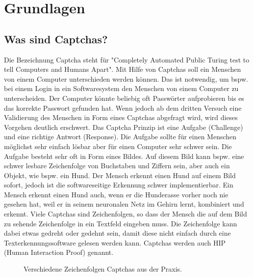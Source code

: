 \section{Grundlagen}

\subsection{Was sind Captchas?}
Die Bezeichnung Captcha steht für "Completely Automated Public Turing test to tell Computers and Humans Apart". Mit Hilfe von Captchas soll ein Menschen von einem Computer unterschieden werden können. Das ist notwendig, um bspw. bei einem Login in ein Softwaresystem den Menschen von einem Computer zu unterscheiden. Der Computer könnte  beliebig oft Passwörter aufprobieren bis es das korrekte Passwort gefunden hat. Wenn jedoch ab dem dritten Versuch eine Validierung des Menschen in Form eines Captchas abgefragt wird, wird dieses Vorgehen deutlich erschwert. Das Captcha Prinzip ist eine Aufgabe (Challenge) und eine richtige Antwort (Response). Die Aufgabe sollte für einen Menschen möglichst sehr einfach lösbar aber für einen Computer sehr schwer sein. Die Aufgabe besteht sehr oft in Form eines Bildes. Auf diesem Bild kann bspw. eine schwer lesbare Zeichenfolge von Buchstaben und Ziffern sein, aber auch ein Objekt, wie bspw. ein Hund. Der Mensch erkennt einen Hund auf einem Bild sofort, jedoch ist die softwareseitige Erkennung  schwer implementierbar. Ein Mensch erkennt einen Hund auch, wenn er die Hunderasse vorher noch nie gesehen hat, weil er in seinem neuronalen Netz im Gehirn lernt, kombiniert und erkennt. Viele Captchas sind Zeichenfolgen, so dass der Mensch die auf dem Bild zu sehende Zeichenfolge in ein Textfeld eingeben muss. Die Zeichenfolge kann dabei etwas gedreht oder gedehnt sein, damit diese nicht einfach durch eine Texterkennungssoftware gelesen werden kann. Captchas werden auch HIP (Human Interaction Proof) genannt.

\begin{figure}[htbp]
  \centering
  \caption{Verschiedene Zeichenfolgen Captchas aus der Praxis.}
  \label{Captchas}
\end{figure}

